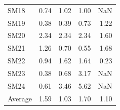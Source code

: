 \documentclass[9pt,lineno,final]{elife}
\begin{document}
\begin{table}[H]
\begin{tabular}{lrrrr}
		SM18 &       0.74 &        1.02 &         1.00 &          NaN \\
		SM19 &       0.38 &        0.39 &         0.73 &         1.22 \\
		SM20 &       2.34 &        2.34 &         2.34 &         1.60 \\
		SM21 &       1.26 &        0.70 &         0.55 &         1.68 \\
		SM22 &       0.94 &        1.62 &         1.64 &         0.23 \\
		SM23 &       0.38 &        0.68 &         3.17 &         NaN \\
		SM24 &       0.61 &        3.46 &         5.62 &         NaN \\
		\midrule
		Average &       1.59 &        1.03 &         1.70 &         1.10 \\
		\bottomrule\end{tabular}
		        
		\end{table}
		
	
		
\end{document}
